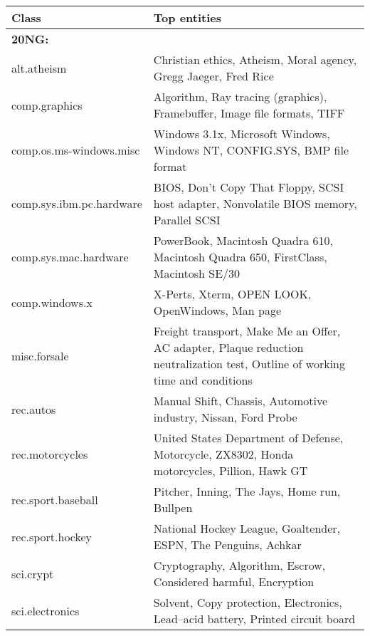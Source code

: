 \documentclass[11pt,a4paper]{article}
\begin{document}
    \begin{table*}[!htb]
        \centering
        \setlength\tabcolsep{3pt}
        \small{
        \begin{tabular}{p{3.5cm}|p{12.1cm}}
            Class & Top entities \\
            \hline
            \small{\textbf{20NG:}}\\
            \small{alt.atheism               } & \small{Christian ethics, Atheism, Moral agency, Gregg Jaeger, Fred Rice}\\
            \small{comp.graphics             } & \small{Algorithm, Ray tracing (graphics), Framebuffer, Image file formats, TIFF}\\
            \small{comp.os.ms-windows.misc   } & \small{Windows 3.1x, Microsoft Windows, Windows NT, CONFIG.SYS, BMP file format}\\
            \small{comp.sys.ibm.pc.hardware  } & \small{BIOS, Don't Copy That Floppy, SCSI host adapter, Nonvolatile BIOS memory, Parallel SCSI}\\
            \small{comp.sys.mac.hardware     } & \small{PowerBook, Macintosh Quadra 610, Macintosh Quadra 650, FirstClass, Macintosh SE/30}\\
            \small{comp.windows.x            } & \small{X-Perts, Xterm, OPEN LOOK, OpenWindows, Man page}\\
            \small{misc.forsale              } & \small{Freight transport, Make Me an Offer, AC adapter, Plaque reduction neutralization test, Outline of working time and conditions}\\
            \small{rec.autos                 } & \small{Manual Shift, Chassis, Automotive industry, Nissan, Ford Probe}\\
            \small{rec.motorcycles           } & \small{United States Department of Defense, Motorcycle, ZX8302, Honda motorcycles, Pillion, Hawk GT}\\
            \small{rec.sport.baseball        } & \small{Pitcher, Inning, The Jays, Home run, Bullpen}\\
            \small{rec.sport.hockey          } & \small{National Hockey League, Goaltender, ESPN, The Penguins, Achkar}\\
            \small{sci.crypt                 } & \small{Cryptography, Algorithm, Escrow, Considered harmful, Encryption}\\
            \small{sci.electronics           } & \small{Solvent, Copy protection, Electronics, Lead–acid battery, Printed circuit board}\\

\end{tabular}}
\end{table*}
\end{document}

